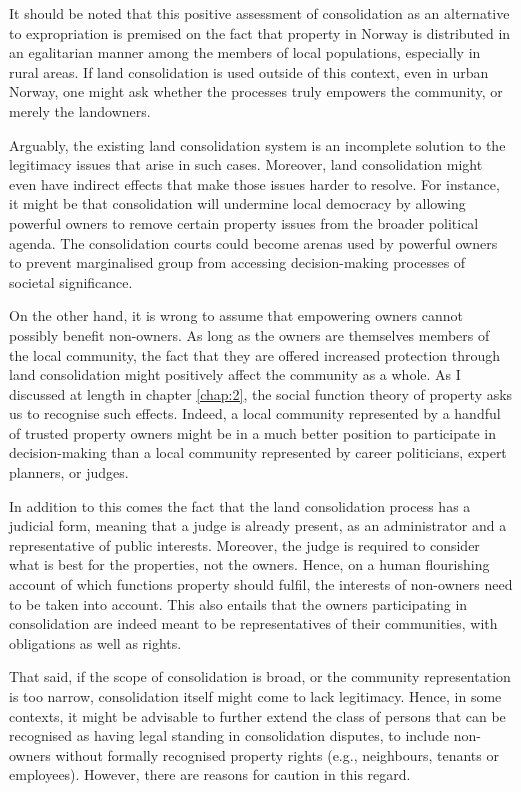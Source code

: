 It should be noted that this positive assessment of consolidation as an alternative to expropriation is  premised on the fact that property in Norway is distributed in an egalitarian manner among the members of local populations, especially in rural areas. If land consolidation is used outside of this context, even in urban Norway, one might ask whether the processes truly empowers the community, or merely the landowners.

Arguably, the existing land consolidation system is an incomplete solution to the legitimacy issues that arise in such cases. Moreover, land consolidation might even have indirect effects that make those issues harder to resolve. For instance, it might be that consolidation will undermine local democracy by allowing powerful owners to remove certain property issues from the broader political agenda. The consolidation courts could become arenas used by powerful owners to prevent marginalised group from accessing decision-making processes of societal significance.

On the other hand, it is wrong to assume that empowering owners cannot possibly benefit non-owners. As long as the owners are themselves members of the local community, the fact that they are offered increased protection through land consolidation might positively affect the community as a whole. As I discussed at length in chapter \ref{chap:2}, the social function theory of property asks us to recognise such effects. Indeed, a local community represented by a handful of trusted property owners might be in a much better position to participate in decision-making than a local community represented by career politicians, expert planners, or judges.

In addition to this comes the fact that the land consolidation process has a judicial form, meaning that a judge is already present, as an administrator and a representative of public interests. Moreover, the judge is required to consider what is best for the properties, not the owners. Hence, on a human flourishing account of which functions property should fulfil, the interests of non-owners need to be taken into account. This also entails that the owners participating in consolidation are indeed meant to be representatives of their communities, with obligations as well as rights.

That said, if the scope of consolidation is broad, or the community representation is too narrow, consolidation itself might come to lack legitimacy. Hence, in some contexts, it might be advisable to further extend the class of persons that can be recognised as having legal standing in consolidation disputes, to include non-owners without formally recognised property rights (e.g., neighbours, tenants or employees). However, there are reasons for caution in this regard. 

